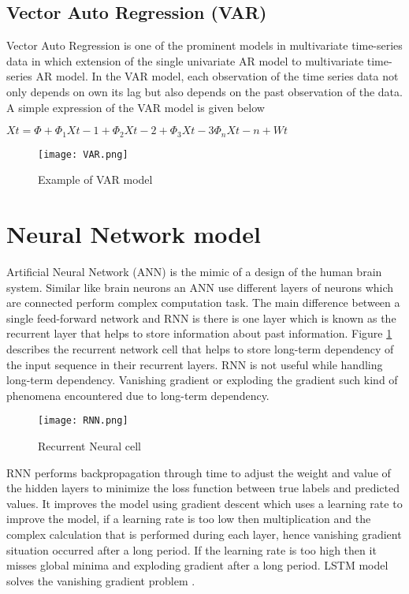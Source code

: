 \subsection{Vector Auto Regression (VAR)}
Vector Auto Regression is one of the prominent models in multivariate time-series data in which extension of the single univariate AR model to multivariate time-series AR model.
In the VAR model, each observation of the time series data not only depends on own its lag but also depends on the past observation of the data. A simple expression of the VAR model is given below

\(Xt =\Phi+ \Phi_{1}Xt-1 + \Phi_{2}Xt-2 + \Phi_{3}Xt-3 \Phi_{n}Xt-n  + Wt\)


\begin{figure}
  \centering
    
      \texttt{[image: VAR.png]}
  \caption{Example of VAR model}
\end{figure}

 
\section{ Neural Network model}
Artificial Neural Network (ANN) is the mimic of a design of the human brain system. Similar like brain neurons an ANN use different layers of neurons which are connected perform complex computation task. The main difference between a single feed-forward network and RNN is there is one layer which is known as the recurrent layer that helps to store information about past information.  Figure \ref{fig:rnn} describes the recurrent network cell that helps to store long-term dependency of the input sequence in their recurrent layers. RNN is not useful while handling long-term dependency. Vanishing gradient or exploding the gradient such kind of phenomena encountered due to long-term dependency.

\begin{figure}
  \centering
    
      \texttt{[image: RNN.png]}
  \caption{Recurrent Neural cell}
  \label{fig:rnn}
\end{figure}

RNN performs backpropagation through time to adjust the weight and value of the hidden layers to minimize the loss function between true labels and predicted values. It improves the model using gradient descent which uses a learning rate to improve the model, if a learning rate is too low then multiplication and the complex calculation that is performed during each layer, hence vanishing gradient situation occurred after a long period. If the learning rate is too high then it misses global minima and exploding gradient after a long period. LSTM model solves the vanishing gradient problem \cite{lechner2020learning}.



